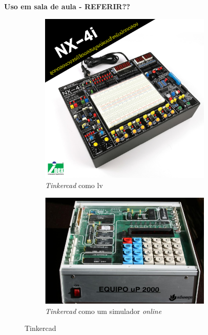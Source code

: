 \textbf{Uso em sala de aula - REFERIR??}
\begin{figure}[hbtp]
    \centering
    \begin{subfigure}[hbtp]{0.48\textwidth}
        \centering
        \includegraphics[width=0.9\textwidth]{figures/nx-4i.jpg}
        \caption{\textit{Tinkercad} como \acrshort{lv}}
        \label{fig:nx4i}
    \end{subfigure}
    \begin{subfigure}[hbtp]{0.48\textwidth}
        \includegraphics[width=0.9\textwidth]{figures/image-1.png}
        \caption{\textit{Tinkercad} como um simulador \textit{online}}
        \label{fig:up}
    \end{subfigure}
    \caption{Tinkercad}
    \label{fig:lab real}
\end{figure}

